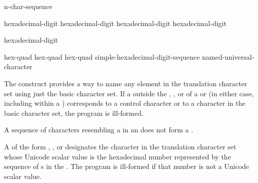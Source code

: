 \begin{bnf}
\br
     n-char-sequence \terminal{\}}
\end{bnf}

\begin{bnf}
\br
    hexadecimal-digit hexadecimal-digit hexadecimal-digit hexadecimal-digit
\end{bnf}

\begin{bnf}
\br
    hexadecimal-digit 
\end{bnf}

\begin{bnf}
\br
     hex-quad\br
     hex-quad hex-quad\br
     simple-hexadecimal-digit-sequence \terminal{\}}\br
    named-universal-character
\end{bnf}

\pnum
The  construct provides a way to name any
element in the translation character set using just the basic character set.
If a  outside
the , , or
 of a  or
(in either case, including within a )
corresponds to a control character or to a character in the basic character set,
the program is ill-formed.
\begin{note}
A sequence of characters resembling a  in an
 does not form a
.
\end{note}

\pnum
A 
of the form  ,
  , or
designates the character in the translation character set
whose Unicode scalar value is the hexadecimal number represented by
the sequence of s
in the .
The program is ill-formed if that number is not a Unicode scalar value.

